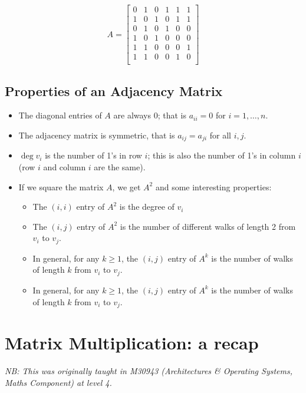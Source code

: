 \begin{center}
    \begin{equation*}
        A =  
        \begin{bmatrix}
        0 & 1 & 0 & 1 & 1 & 1 \\
        1 & 0 & 1 & 0 & 1 & 1 \\
        0 & 1 & 0 & 1 & 0 & 0 \\
        1 & 0 & 1 & 0 & 0 & 0 \\
        1 & 1 & 0 & 0 & 0 & 1 \\
        1 & 1 & 0 & 0 & 1 & 0 \\
        \end{bmatrix}
    \end{equation*}
\end{center}

\subsection{Properties of an Adjacency Matrix}
\begin{itemize}
    \item The diagonal entries of $A$ are always 0; that is $a_{ii} = 0$ for $i = 1, \ldots, n$.
    \item The adjacency matrix is symmetric, that is $a_{ij} = a_{ji}$ for all $i, j$.
    \item $\deg v_i$ is the number of 1's in row $i$; this is also the number of 1's in column $i$ (row $i$ and column $i$ are the same). 
    \item If we square the matrix $A$, we get $A^2$ and some interesting properties:
    \begin{itemize}
        \item The $(i, i)$ entry of $A^2$ is the degree of $v_i$
        \item The $(i, j)$ entry of $A^2$ is the number of different walks of length 2 from $v_i$ to $v_j$. 
        \item In general, for any $k \geq 1$, the $(i, j)$ entry of $A^k$ is the number of walks of length $k$ from $v_i$ to $v_j$. 
        \item In general, for any $k \geq 1$, the $(i, j)$ entry of $A^k$ is the number of walks of length $k$ from $v_i$ to $v_j$. 
    \end{itemize}
\end{itemize}

\section{Matrix Multiplication: a recap}
\textit{NB: This was originally taught in M30943 (Architectures \& Operating Systems, Maths Component) at level 4.}\\

